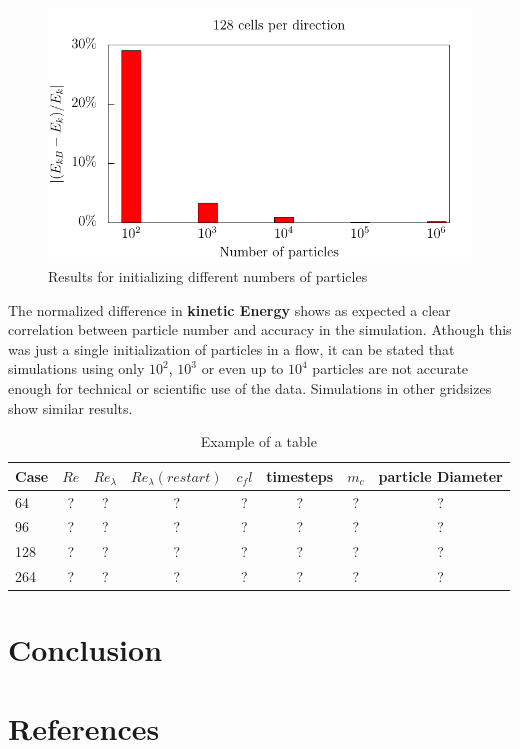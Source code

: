 \documentclass[a4paper,12pt]{article}
\numberwithin{equation}{section} %
\begin{document}
\begin{figure}[h]
	\centering
  \includegraphics[width=\textwidth]{./../Simulationsergebnisse/variationPartikelAnzahl/128/kineticEnergy_numberOfParticles.pdf}
	\caption{Results for initializing different numbers of particles}
	\label{kineticEnergy_numberOfParticles}
\end{figure}
The normalized difference in \textbf{kinetic Energy} shows as expected a clear correlation between particle number and accuracy in the simulation. Athough this was just a single initialization of particles in a flow, it can be stated that simulations using only $10^2$, $10^3$ or even up to $10^4$ particles are not accurate enough for technical or scientific use of the data. Simulations in other gridsizes show similar results.
\pagebreak
\begin{table}[h]
\begin{tabular}{l | c c c c c c c }
Case & $Re$ & $Re_\lambda$ & $Re_\lambda (restart)$ & $c_fl$ & timesteps  & $m_c$ & particle Diameter \\
\hline
\hline
64 & ? & ? & ? & ? & ? & ? & ? \\
96 & ? & ? & ? & ? & ? & ? & ? \\
128 & ? & ? & ? & ? & ? & ? & ?  \\
264 & ? & ? & ? & ? & ? & ? & ?  \\
\hline
\end{tabular}
\caption{Example of a table}
\label{table1}
\end{table}
\pagebreak
\section{Conclusion}
\pagebreak
\section{References}
\nocite{*} %
\pagebreak
\end{document}
